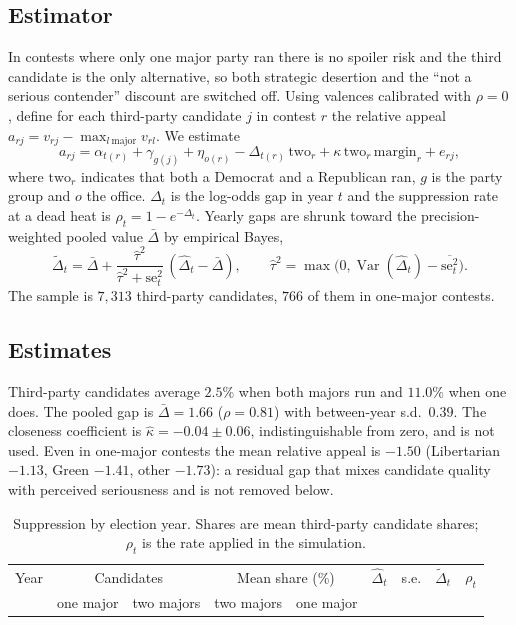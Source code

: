 \documentclass[11pt]{article}
\begin{document}
\subsection{Estimator}
In contests where only one major party ran there is no spoiler risk and the third candidate is the only alternative, so both strategic desertion and the ``not a serious contender'' discount are switched off. Using valences calibrated with $\rho=0$, define for each third-party candidate $j$ in contest $r$ the relative appeal $a_{rj}=v_{rj}-\max_{l\ \text{major}}v_{rl}$. We estimate
\begin{equation}
a_{rj} = \alpha_{t(r)} + \gamma_{g(j)} + \eta_{o(r)} - \Delta_{t(r)}\,\mathrm{two}_r + \kappa\,\mathrm{two}_r\,\mathrm{margin}_r + e_{rj},
\end{equation}
where $\mathrm{two}_r$ indicates that both a Democrat and a Republican ran, $g$ is the party group and $o$ the office. $\Delta_t$ is the log-odds gap in year $t$ and the suppression rate at a dead heat is $\rho_t = 1-e^{-\Delta_t}$. Yearly gaps are shrunk toward the precision-weighted pooled value $\bar\Delta$ by empirical Bayes,
\begin{equation}
\tilde\Delta_t = \bar\Delta + \frac{\hat\tau^2}{\hat\tau^2+\mathrm{se}_t^2}\,(\hat\Delta_t-\bar\Delta), \qquad \hat\tau^2=\max\!\big(0,\operatorname{Var}(\hat\Delta_t)-\overline{\mathrm{se}_t^2}\big).
\end{equation}
The sample is $7{,}313$ third-party candidates, $766$ of them in one-major contests.

\FloatBarrier
\subsection{Estimates}
Third-party candidates average $2.5\%$ when both majors run and $11.0\%$ when one does. The pooled gap is $\bar\Delta=1.66$ ($\rho=0.81$) with between-year s.d.\ $0.39$. The closeness coefficient is $\hat\kappa=-0.04\pm0.06$, indistinguishable from zero, and is not used. Even in one-major contests the mean relative appeal is $-1.50$ (Libertarian $-1.13$, Green $-1.41$, other $-1.73$): a residual gap that mixes candidate quality with perceived seriousness and is not removed below.

\begin{table}[H]\centering\small
\caption{Suppression by election year. Shares are mean third-party candidate shares; $\rho_t$ is the rate applied in the simulation.}
\begin{tabular}{rrrrrrrrr}
\toprule
Year & \multicolumn{2}{c}{Candidates} & \multicolumn{2}{c}{Mean share (\%)} & $\hat\Delta_t$ & s.e. & $\tilde\Delta_t$ & $\rho_t$ \\
 & one major & two majors & two majors & one major & & & & \\
\midrule

\bottomrule
\end{tabular}
\end{table}
\end{document}
